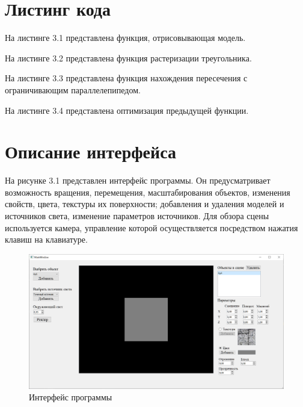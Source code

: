\documentclass[12pt,a4paper,oneside]{report}
\begin{document}
	\section{Листинг кода}
	 \quad На листинге 3.1 представлена функция, отрисовывающая модель.
	
	
	
	 На листинге 3.2 представлена функция растеризации треугольника.
	
	
	
	 На листинге 3.3 представлена функция нахождения пересечения с ограничивающим параллелепипедом.
	
	
	
	 На листинге 3.4 представлена оптимизация предыдущей функции.
	
	
	

	\section{Описание интерфейса}
	\quad  На рисунке 3.1 представлен интерфейс программы. 
	Он предусматривает возможность вращения, перемещения, масштабирования объектов, изменения свойств, цвета, текстуры их поверхности; добавления и удаления моделей и источников света, изменение параметров источников. Для обзора сцены используется камера, управление которой осуществляется посредством нажатия клавиш на клавиатуре.	
	
	\begin{figure}[H]
		\centering
		\includegraphics[scale = 0.5]{interface}
		\caption{Интерфейс программы}
	\end{figure}
\end{document}
